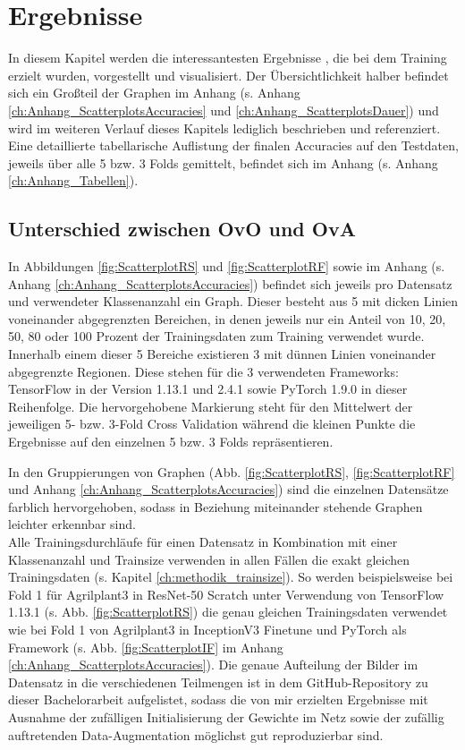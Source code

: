 \chapter{Ergebnisse}
\label{ch:ergebnisse}
In diesem Kapitel werden die interessantesten Ergebnisse \cite{githubRepo}, die bei dem Training erzielt wurden, vorgestellt und visualisiert. Der Übersichtlichkeit halber befindet sich ein Großteil der Graphen im Anhang (s. Anhang \ref{ch:Anhang_ScatterplotsAccuracies} und \ref{ch:Anhang_ScatterplotsDauer}) und wird im weiteren Verlauf dieses Kapitels lediglich beschrieben und referenziert.
Eine detaillierte tabellarische Auflistung der finalen Accuracies auf den Testdaten, jeweils über alle 5 bzw. 3 Folds gemittelt, befindet sich im Anhang (s. Anhang \ref{ch:Anhang_Tabellen}).

\section{Unterschied zwischen OvO und OvA}
\label{ch:ergebnisseOvOOvA}
In Abbildungen \ref{fig:ScatterplotRS} und \ref{fig:ScatterplotRF} sowie im Anhang (s. Anhang \ref{ch:Anhang_ScatterplotsAccuracies}) befindet sich jeweils pro Datensatz und verwendeter Klassenanzahl ein Graph. Dieser besteht aus 5 mit dicken Linien voneinander abgegrenzten Bereichen, in denen jeweils nur ein Anteil von 10, 20, 50, 80 oder 100 Prozent der Trainingsdaten zum Training verwendet wurde. Innerhalb einem dieser 5 Bereiche existieren 3 mit dünnen Linien voneinander abgegrenzte Regionen. Diese stehen für die 3 verwendeten Frameworks: TensorFlow in der Version 1.13.1 und 2.4.1 \cite{tensorflow} sowie PyTorch 1.9.0 \cite{pytorch} in dieser Reihenfolge. Die hervorgehobene Markierung steht für den Mittelwert der jeweiligen 5- bzw. 3-Fold Cross Validation während die kleinen Punkte die Ergebnisse auf den einzelnen 5 bzw. 3 Folds repräsentieren.

In den Gruppierungen von Graphen (Abb. \ref{fig:ScatterplotRS}, \ref{fig:ScatterplotRF} und Anhang \ref{ch:Anhang_ScatterplotsAccuracies}) sind die einzelnen Datensätze farblich hervorgehoben, sodass in Beziehung miteinander stehende Graphen leichter erkennbar sind.\\

Alle Trainingsdurchläufe für einen Datensatz in Kombination mit einer Klassenanzahl und Trainsize verwenden in allen Fällen die exakt gleichen Trainingsdaten (s. Kapitel \ref{ch:methodik_trainsize}). So werden beispielsweise bei Fold 1 für Agrilplant3 in ResNet-50 Scratch unter Verwendung von TensorFlow 1.13.1 \cite{tensorflow} (s. Abb. \ref{fig:ScatterplotRS}) die genau gleichen Trainingsdaten verwendet wie bei Fold 1 von Agrilplant3 in InceptionV3 Finetune und PyTorch \cite{pytorch} als Framework (s. Abb. \ref{fig:ScatterplotIF} im Anhang \ref{ch:Anhang_ScatterplotsAccuracies}). Die genaue Aufteilung der Bilder im Datensatz in die verschiedenen Teilmengen ist in dem GitHub-Repository zu dieser Bachelorarbeit \cite{githubRepo} aufgelistet, sodass die von mir erzielten Ergebnisse mit Ausnahme der zufälligen Initialisierung der Gewichte im Netz sowie der zufällig auftretenden Data-Augmentation möglichst gut reproduzierbar sind.\\

